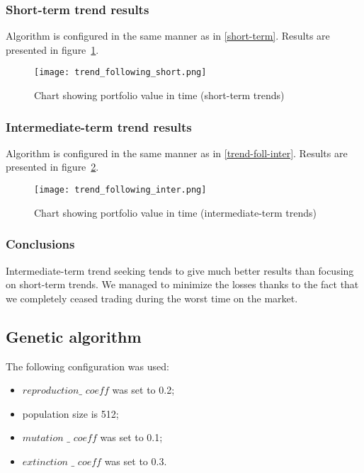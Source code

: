 \subsubsection{Short-term trend results}

Algorithm is configured in the same manner as in \ref{short-term}.
Results are presented in figure~\ref{fig:trend_foll_short}.

\begin{figure}[ht]
  \begin{center}
    \texttt{[image: trend\_following\_short.png]}
  \end{center}
  \caption{Chart showing portfolio value in time (short-term trends)}
  \label{fig:trend_foll_short}
\end{figure}


\subsubsection{Intermediate-term trend results}

Algorithm is configured in the same manner as in \ref{trend-foll-inter}.
Results are presented in figure~\ref{fig:trend_foll_inter}.

\begin{figure}[ht]
  \begin{center}
    \texttt{[image: trend\_following\_inter.png]}
  \end{center}
  \caption{Chart showing portfolio value in time (intermediate-term trends)}
  \label{fig:trend_foll_inter}
\end{figure}


\subsubsection{Conclusions}

Intermediate-term trend seeking tends to give much better results than focusing on short-term trends.
We managed to minimize the losses thanks to the fact that we completely ceased trading during the worst time on the market.

\subsection{Genetic algorithm}

The following configuration was used:
\begin{itemize}
  \item $reproduction\_$ $coeff$ was set to 0.2;
  \item population size is 512;
  \item $mutation$ $\_$ $coeff$ was set to 0.1;
  \item $extinction$ $\_$ $coeff$ was set to 0.3.
\end{itemize}

